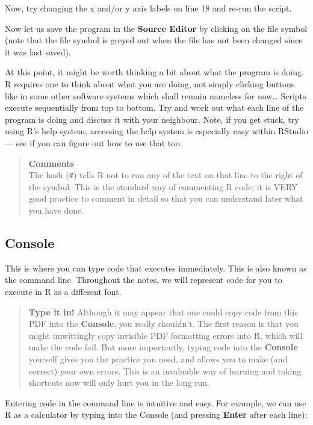 \documentclass[]{book}
\theoremstyle{definition}
\theoremstyle{definition}
\theoremstyle{definition}
\theoremstyle{remark}
\begin{document}
Now, try changing the x and/or y axis labels on line 18 and re-run the
script.

Now let us save the program in the \textbf{Source Editor} by clicking on
the file symbol (note that the file symbol is greyed out when the file
has not been changed since it was last saved).

At this point, it might be worth thinking a bit about what the program
is doing. R requires one to think about what you are doing, not simply
clicking buttons like in some other software systems which shall remain
nameless for now\ldots{} Scripts execute sequentially from top to
bottom. Try and work out what each line of the program is doing and
discuss it with your neighbour. Note, if you get stuck, try using R's
help system; accessing the help system is especially easy within RStudio
--- see if you can figure out how to use that too.

\begin{quote}
\textbf{Comments}\\
The hash (\texttt{\#}) tells R not to run any of the text on that line
to the right of the symbol. This is the standard way of commenting R
code; it is VERY good practice to comment in detail so that you can
understand later what you have done.
\end{quote}

\subsection{Console}\label{console}

This is where you can type code that executes immediately. This is also
known as the command line. Throughout the notes, we will represent code
for you to execute in R as a different font.

\begin{quote}
\textbf{Type it in!} Although it may appear that one could copy code
from this PDF into the \textbf{Console}, you really shouldn't. The first
reason is that you might unwittingly copy invisible PDF formatting
errors into R, which will make the code fail. But more importantly,
typing code into the \textbf{Console} yourself gives you the practice
you need, and allows you to make (and correct) your own errors. This is
an invaluable way of learning and taking shortcuts now will only hurt
you in the long run.
\end{quote}

Entering code in the command line is intuitive and easy. For example, we
can use R as a calculator by typing into the Console (and pressing
\textbf{Enter} after each line):
\end{document}
